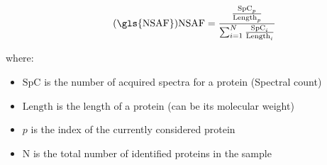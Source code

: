 \begin{minipage}{\textwidth}

\begin{equation}\label{eq:NSAF}
       \tag{\gls{NSAF}}
       \text{NSAF} = \frac{\frac{\text{SpC}_p}{\text{Length}_p}}{%
       \sum_{i=1}^N \frac{\text{SpC}_i}{\text{Length}_i}
       }
\end{equation}

where:
{\small
\begin{itemize}
        \item $\text{SpC}$ is the number of acquired spectra for a protein (Spectral count)
        \item $\text{Length}$ is the length of a protein (can be its molecular weight)
        \item $p$ is the index of the currently considered protein
        \item N is the total number of identified proteins in the sample
\end{itemize}
}

\end{minipage}
